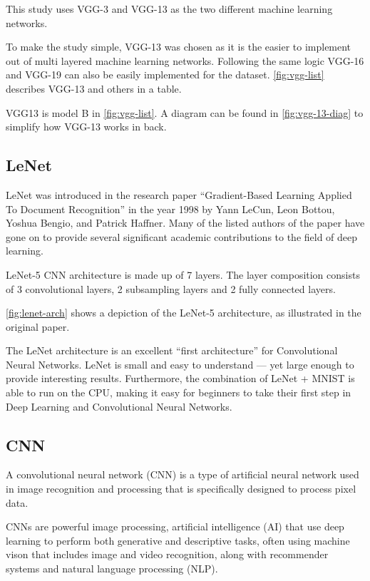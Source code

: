 This study uses VGG-3 and VGG-13 as the two different machine learning networks.\par 
To make the study simple, VGG-13 was chosen as it is the easier to implement out of multi layered machine learning networks. Following the same logic VGG-16 and VGG-19 can also be easily implemented for the dataset. \cref{fig:vgg-list} describes VGG-13 and others in a table. \par
VGG13 is model B in  \cref{fig:vgg-list}. A diagram can be found in \cref{fig:vgg-13-diag} to simplify how VGG-13 works in back.
\subsection{LeNet}

LeNet was introduced in the research paper “Gradient-Based Learning Applied To Document Recognition” in the year 1998 by Yann LeCun, Leon Bottou, Yoshua Bengio, and Patrick Haffner. Many of the listed authors of the paper have gone on to provide several significant academic contributions to the field of deep learning.\par
LeNet-5 CNN architecture is made up of 7 layers. The layer composition consists of 3 convolutional layers, 2 subsampling layers and 2 fully connected layers. \par

\cref{fig:lenet-arch} shows a depiction of the LeNet-5 architecture, as illustrated in the original paper. \par

The LeNet architecture is an excellent “first architecture” for Convolutional Neural Networks. LeNet is small and easy to understand — yet large enough to provide interesting results. Furthermore, the combination of LeNet + MNIST is able to run on the CPU, making it easy for beginners to take their first step in Deep Learning and Convolutional Neural Networks. \par

\subsection{CNN}
A convolutional neural network (CNN) is a type of artificial neural network used in image recognition and processing that is specifically designed to process pixel data.\par

CNNs are powerful image processing, artificial intelligence (AI) that use deep learning to perform both generative and descriptive tasks, often using machine vison that includes image and video recognition, along with recommender systems and natural language processing (NLP).\par


